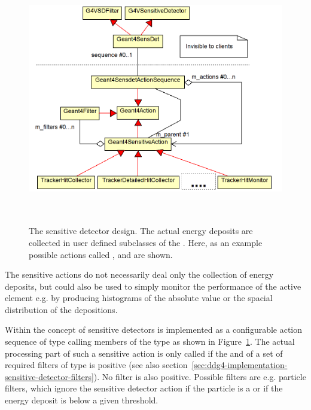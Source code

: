 \begin{figure}[t]
  \begin{center}
    \includegraphics[height=110mm] {DDG4-Sensitive-detector.png}
    \caption{The sensitive detector design. The actual energy deposits are 
        collected in user defined subclasses of the .
        Here, as an example possible actions called ,
         and  are shown.}
    \label{fig:ddg4-implementation-sensitive-detector}
  \end{center}
\end{figure}

\noindent
The sensitive actions do not necessarily deal only the collection of energy 
deposits, but could also be used to simply monitor the performance of the
active element e.g. by producing histograms of the absolute value or the 
spacial distribution of the depositions.

\noindent
Within \DDG the concept of sensitive  detectors is implemented as a
configurable  action sequence of type 
{}
calling members of the type 
{} as shown in 
Figure~\ref{fig:ddg4-implementation-sensitive-detector}. The actual processing
part of such a sensitive action is only called if the and of a set of
required filters of type  is positive (see also 
section~\ref{sec:ddg4-implementation-sensitive-detector-filters}). No filter 
is also positive. Possible filters are e.g. particle filters, which ignore the
sensitive detector action if the particle is a  or if the
energy deposit is below a given threshold.

